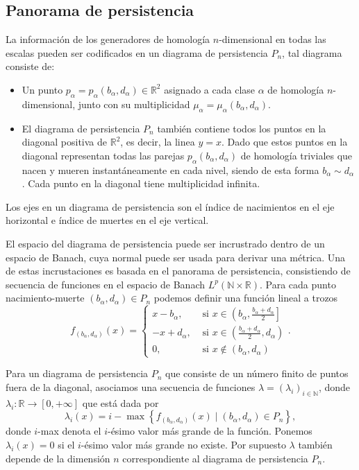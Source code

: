\subsection{Panorama de persistencia}

La información de los generadores de homología $n$-dimensional en todas las escalas pueden ser codificados en un diagrama de persistencia $P_n$, tal diagrama consiste de:

\begin{itemize}
	\item Un punto $p_\alpha = p_\alpha(b_\alpha,d_\alpha) \in \mathbb{R}^{2}$ asignado a cada clase $\alpha$ de homología $n$-dimensional, junto con su multiplicidad $\mu_\alpha = \mu_\alpha(b_\alpha,d_\alpha)$.
	
	\item El diagrama de persistencia $P_n$ también contiene todos los puntos en la diagonal positiva de $\mathbb{R}^{2}$, es decir, la linea $y=x$. Dado que estos puntos en la diagonal representan todas las parejas $p_\alpha(b_\alpha,d_\alpha)$ de homología triviales que nacen y mueren instantáneamente en cada nivel, siendo de esta forma $b_\alpha \sim d_\alpha$. Cada punto en la diagonal tiene multiplicidad infinita.
\end{itemize}

Los ejes en un diagrama de persistencia son el índice de nacimientos en el eje horizontal e índice de muertes en el eje vertical.

El espacio del diagrama de persistencia puede ser incrustrado dentro de un espacio de Banach, cuya normal puede ser usada para derivar una métrica. Una de estas incrustaciones es basada en el panorama de persistencia, consistiendo de secuencia de funciones en el espacio de Banach $L^p\left(\mathbb{N}\times  \mathbb{R}\right)$. Para cada punto nacimiento-muerte $(b_\alpha,d_\alpha) \in P_n$ podemos definir una función lineal a trozos
\[
f_{\left(b_{\alpha}, d_{\alpha}\right)}(x)= \begin{cases}x-b_{\alpha}, & \text { si } x \in\left(b_{\alpha}, \frac{b_{\alpha}+d_{\alpha}}{2}\right] \\ -x+d_{\alpha}, & \text { si } x \in\left(\frac{b_{\alpha}+d_{\alpha}}{2}, d_{\alpha}\right) \\ 0, & \text { si } x \notin\left(b_{\alpha}, d_{\alpha}\right)\end{cases}.
\] 

Para un diagrama de persistencia $P_n$ que consiste de un número finito de puntos fuera de la diagonal, asociamos una secuencia de funciones $\lambda = (\lambda_i)_{i\in \mathbb{N}}$, donde $\lambda_i : \mathbb{R} \to [0,+\infty]$ que está dada por 
\[
\lambda_{i}(x)=i-\max \left\{f_{\left(b_{\alpha}, d_{\alpha}\right)}(x) \mid\left(b_{\alpha}, d_{\alpha}\right) \in P_{n}\right\},
\]
donde $i$-max denota el $i$-ésimo valor más grande de la función. Ponemos $\lambda_i (x) = 0$ si el $i$-ésimo valor más grande no existe. Por supuesto $\lambda$ también depende de la dimensión $n$ correspondiente al diagrama de persistencia $P_n$. 


